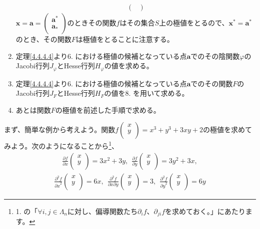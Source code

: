 \documentclass[dvipdfmx]{jsarticle}
\begin{document}
\begin{enumerate}
\begin{align*}
\begin{pmatrix}
\end{pmatrix}
\end{align*}
$\mathbf{x} = \mathbf{a} = \begin{pmatrix}
\mathbf{a}^{*} \\
\mathbf{a}_{*} \\
\end{pmatrix}$のときその関数$f$はその集合$S$上の極値をとるので、$\mathbf{x}^{*} = \mathbf{a}^{*}$のとき、その関数$F$は極値をとることに注意する。
\item
  定理\ref{4.4.4.4}より6. における極値の候補となっている点$\mathbf{a}$でのその陰関数$\varphi$のJacobi行列$J_{\varphi}$とHesse行列$H_{\varphi}$の値を求める。
\item
  定理\ref{4.4.4.4}より6. における極値の候補となっている点$\mathbf{a}$でのその関数$F$のJacobi行列$J_{F}$とHesse行列$H_{F}$の値を8. を用いて求める。
\item
  あとは関数$F$の極値を前述した手順で求める。
\end{enumerate}\par
まず、簡単な例から考えよう。関数$f\begin{pmatrix}
x \\
y \\
\end{pmatrix} = x^{3} + y^{3} + 3xy + 2$の極値を求めてみよう。次のようになることから\footnote{1. の「$\forall i,j \in \varLambda_{n}$に対し、偏導関数たち$\partial_{i}f$、$\partial_{ji}f$を求めておく。」にあたります。}、
\begin{align*}
\frac{\partial f}{\partial x}\begin{pmatrix}
x \\
y \\
\end{pmatrix} = 3x^{2} + 3y,\ \ \frac{\partial f}{\partial y}\begin{pmatrix}
x \\
y \\
\end{pmatrix} = 3y^{2} + 3x,
\end{align*}
\begin{align*}
\frac{\partial^{2}f}{{\partial x}^{2}}\begin{pmatrix}
x \\
y \\
\end{pmatrix} = 6x,\ \ \frac{\partial^{2}f}{\partial x\partial y}\begin{pmatrix}
x \\
y \\
\end{pmatrix} = 3,\ \ \frac{\partial^{2}f}{{\partial y}^{2}}\begin{pmatrix}
x \\
y \\
\end{pmatrix} = 6y
\end{align*}
\end{document}
